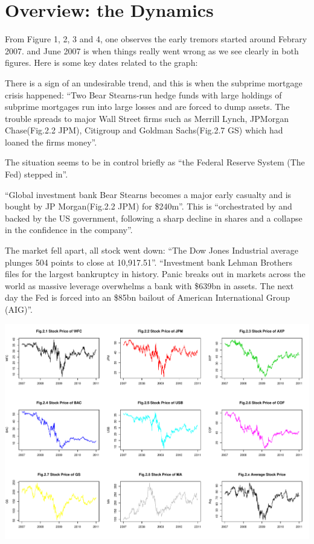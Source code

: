 \documentclass[11pt]{article}
\begin{document}
\section{Overview: the Dynamics}\vspace{-1em}
From Figure 1, 2, 3 and 4, one observes the early tremors started around Febrary 2007. and June 2007 is when things really went wrong as we see clearly in both figures. Here is some key dates related to the graph:
\begin{description}\vspace{-1em}
\item[Jun. 2008] There is a sign of an undesirable trend, and this is when the subprime mortgage crisis happened: ``Two Bear Stearns-run hedge funds with large holdings of subprime mortgages run into large losses and are forced to dump assets. The trouble spreads to major Wall Street firms such as Merrill Lynch, JPMorgan Chase(Fig.2.2 JPM), Citigroup and Goldman Sachs(Fig.2.7 GS) which had loaned the firms money''\cite{Guillen}.
\item[22 Jan. 2008] The situation seems to be in control briefly as ``the Federal Reserve System (The Fed) stepped in''\cite{Jolly}.
\item[14 Mar. 2008] ``Global investment bank Bear Stearns becomes a major early casualty and is bought by JP Morgan(Fig.2.2 JPM) for \$240m''\cite{Jolly}. This is ``orchestrated by and backed by the US government, following a sharp decline in shares and a collapse in the confidence in the company''\cite{Guillen}.
\item[15 Sep. 2008] The market fell apart, all stock went down: ``The Dow Jones Industrial average plunges 504 points to close at 10,917.51''\cite{Guillen}. ``Investment bank Lehman Brothers files for the largest bankruptcy in history. Panic breaks out in markets across the world as massive leverage overwhelms a bank with \$639bn in assets. The next day the Fed is forced into an \$85bn bailout of American International Group (AIG)''\cite{Jolly}.
\end{description}
\begin{center}
\includegraphics[width=0.95\linewidth]{graph/FinancialStockPrice.pdf}
\end{center}
\end{document}
